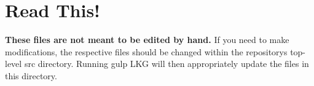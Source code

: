 \chapter{Read This!}
\hypertarget{md_node__modules_2typescript_2lib_2README}{}\label{md_node__modules_2typescript_2lib_2README}
\label{md_node__modules_2typescript_2lib_2README_autotoc_md28932}%
%
 {\bfseries{These files are not meant to be edited by hand.}} If you need to make modifications, the respective files should be changed within the repository\textquotesingle{}s top-\/level {\ttfamily src} directory. Running {\ttfamily gulp LKG} will then appropriately update the files in this directory. 